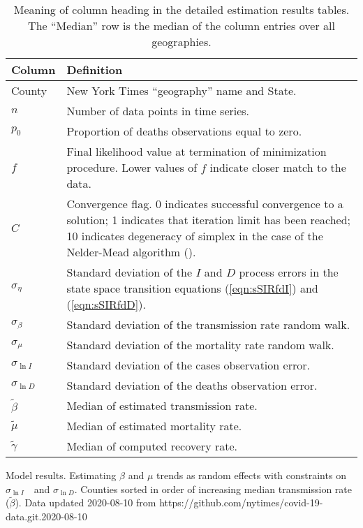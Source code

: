 \documentclass[12pt,letterpaper]{article}
\newcommand\slI{$\sigma_{\ln I}$\ }
\newcommand\slD{$\sigma_{\ln D}$}
\begin{document}
\begin{appendices}
\begin{table}[!ht]
\caption{\label{tab:colheads}
Meaning of column heading in the detailed estimation results tables.
The ``Median'' row is the median of the column entries over all
geographies.
}
\begin{tabularx}{\textwidth}{ l X }
\hline
Column & Definition\\
\hline
County & New York Times ``geography'' name and State.\\
$n$ & Number of data points in time series.\\
$p_0$ &  Proportion of deaths observations equal to zero.\\
$f$ & Final likelihood value at termination of minimization
procedure. Lower values of $f$ indicate closer match to the data.\\
$C$ & Convergence flag. 0 indicates successful convergence to a
solution; 1 indicates that iteration limit has been reached; 10
indicates degeneracy of simplex in the case of the Nelder-Mead
algorithm (\cite{Baudin2010}).\\
$\sigma_\eta$ & Standard deviation of the $I$ and $D$ process errors
in the state space transition equations (\ref{eqn:sSIRfdI}) and
(\ref{eqn:sSIRfdD}).\\
$\sigma_\beta$ & Standard deviation of the transmission rate random
walk.\\
$\sigma_\mu$ & Standard deviation of the mortality rate random walk.\\
$\sigma_{\ln I}$ & Standard deviation of the cases observation error.\\
$\sigma_{\ln D}$ & Standard deviation of the deaths observation error.\\
$\tilde{\beta}$ & Median of estimated transmission rate.\\
$\tilde{\mu}$ & Median of estimated mortality rate.\\
$\tilde\gamma$ & Median of computed recovery rate.\\
\hline

\end{tabularx}

\end{table}



\begin{sidewaystable}
\caption{\label{tab:cons}
Model results. Estimating $\beta$ and $\mu$ trends as random effects with 
constraints on \slI\  and \slD.
Counties sorted in order of increasing median transmission rate ($\tilde\beta$).
Data updated 2020-08-10 from https://github.com/nytimes/covid-19-data.git.2020-08-10
}
\centering
{\scriptsize

}
\end{sidewaystable}
\end{appendices}
\end{document}
